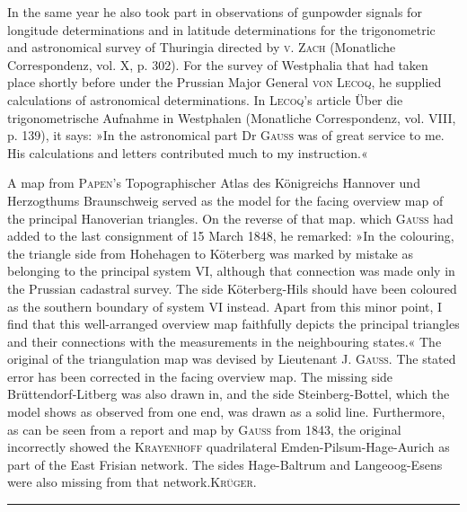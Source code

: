\par\noindent\hspace*{\parindent}In the same year he also took part in observations of gunpowder signals for longitude determinations and in latitude determinations for the trigonometric and astronomical survey of Thuringia directed by \textsc{v. Zach} (Monatliche Correspondenz, vol. X, p. 302). For the survey of Westphalia that had taken place shortly before under the Prussian Major General \textsc{von Lecoq}, he supplied calculations of astronomical determinations. In \textsc{Lecoq}'s article Über die trigonometrische Aufnahme in Westphalen (Monatliche Correspondenz, vol. VIII, p. 139), it says: »In the astronomical part Dr \textsc{Gauss} was of great service to me. His calculations and letters contributed much to my instruction.«
\par\bigskip
\par\noindent\hspace*{\parindent}A map from \textsc{Papen}'s Topographischer Atlas des Königreichs Hannover und Herzogthums Braunschweig served as the model for the facing overview map of the principal Hanoverian triangles. On the reverse of that map. which \textsc{Gauss} had added to the last consignment of 15 March 1848, he remarked: »In the colouring, the triangle side from Hohehagen to Köterberg was marked by mistake as belonging to the principal system VI, although that connection was made only in the Prussian cadastral survey. The side Köterberg-Hils should have been coloured as the southern boundary of system VI instead. Apart from this minor point, I find that this well-arranged overview map faithfully depicts the principal triangles and their connections with the measurements in the neighbouring states.« The original of the triangulation map was devised by Lieutenant J. \textsc{Gauss}. The stated error has been corrected in the facing overview map. The missing side Brüttendorf-Litberg was also drawn in, and the side Steinberg-Bottel, which the model shows as observed from one end, was drawn as a solid line. Furthermore, as can be seen from a report and map by \textsc{Gauss} from 1843, the original incorrectly showed the \textsc{Krayenhoff} quadrilateral Emden-Pilsum-Hage-Aurich as part of the East Frisian network. The sides Hage-Baltrum and Langeoog-Esens were also missing from that network.\hfill\textsc{Krüger}.
\begin{center}\rule{2.6cm}{0.4pt}\end{center}
\par\endgroup

